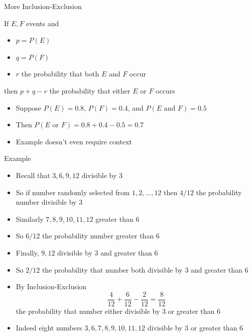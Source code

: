\documentclass[handout]{beamer}
\theoremstyle{definition}
\begin{document}
\begin{frame}{More Inclusion-Exclusion}
\begin{theorem}
If $E,F$ events and
\begin{itemize}
\item $p=P\left(E\right)$
\item $q=P\left(F\right)$
\item $r$ the probability that \alert{both} $E$ and $F$ occur
\end{itemize}
then $p+q-r$ the probability that \alert{either} $E$ or $F$ occurs
\end{theorem}
\begin{example}[Exercise 11]
\begin{itemize}
\item Suppose $P\left(E\right)=0.8$,
$P\left(F\right)=0.4$, and $P\left(\text{$E$ and $F$}\right)=0.5$
\item Then $P\left(\text{$E$ or $F$}\right)
=0.8+0.4-0.5=0.7$
\item Example doesn't even require context
\end{itemize}
\end{example}
\end{frame}

\begin{frame}{Example}
\begin{itemize}
\item Recall that $3,6,9,12$ divisible by $3$
\item So if number randomly selected from
$1,2,\ldots,12$ then $4/12$
the probability number divisible by $3$
\item Similarly $7,8,9,10,11,12$ greater than $6$
\item So $6/12$ the probability number
greater than $6$
\item Finally, $9,12$ divisible by $3$ \alert{and}
greater than $6$
\item So $2/12$ the probability that number
both divisible by $3$ and greater than $6$
\item By Inclusion-Exclusion
\[\frac{4}{12}+\frac{6}{12}-\frac{2}{12}=\frac{8}{12}\]
the probability
that number \alert{either} divisible by $3$ or greater than $6$
\item Indeed eight numbers $3,6,7,8,9,10,11,12$ 
divisible by $3$ or greater than $6$
\end{itemize}
\end{frame}
\end{document}
